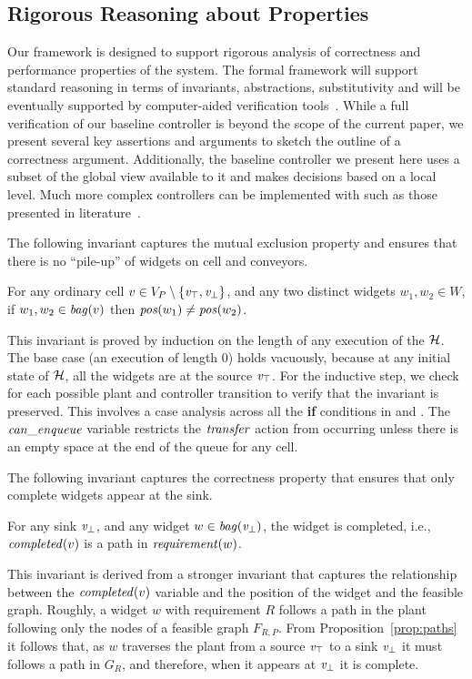 \subsection{Rigorous Reasoning about Properties}
\label{sec:prop}
Our \mfname framework is designed to support rigorous analysis of correctness and performance properties of the system. The formal framework will support standard reasoning in terms of invariants, abstractions,  substitutivity and will be eventually supported by  computer-aided verification tools~\cite{IOA89}.
%
While a full verification of our baseline controller is beyond the scope of the current paper, we present several key assertions and arguments to sketch the outline of a correctness argument. Additionally, the baseline controller we present here uses a subset of the global view available to it and makes decisions based on a local level. Much more complex controllers can be implemented with \mfname such as those presented in literature~\cite{Taylor2015}.

The following invariant  captures the mutual exclusion property and ensures that there is no ``pile-up'' of widgets on cell and conveyors. 
\begin{proposition}
\label{prop:mutex}
 For any ordinary cell $v \in V_P\setminus \{\mathit{v}_\top,\mathit{v}_\bot\}$, and any two distinct widgets $w_1, w_2 \in W$,
 if $w_1, w_2 \in \mathit{bag}(v)$ then $\mathit{pos}(w_1) \neq \mathit{pos}(w_2)$.
 \end{proposition}	
This invariant is  proved by induction on  the length of any execution of the $\mathcal{H}$. 
The base case (an execution of length $0$) holds vacuously, because at any  initial state of $\mathcal{H}$, all the widgets are at the source $\mathit{v}_\top$. For the inductive step, we check for each possible plant and controller transition to verify that the invariant is preserved. This involves a case analysis across all the {\bf if\/} conditions in  and . The $\mathit{can\_enqueue}$ variable restricts the $\mathit{transfer}$ action from occurring unless there is an empty space at the end of the queue for any cell.

The following invariant  captures the correctness property that ensures that only complete widgets appear at the sink.
\begin{proposition}
	\label{prop:completeness}
	For any sink $\mathit{v}_\bot$, and any widget $w \in \mathit{bag}(\mathit{v}_\bot)$, the widget is completed, i.e., 
	$\mathit{completed}(v)$ is a path in $\mathit{requirement}(w)$. 
\end{proposition}
This invariant is derived from a stronger invariant that captures the relationship between the $\mathit{completed}(v)$ variable and the position of the widget and the feasible graph. 
Roughly, a widget $w$ with requirement $R$ follows a path in the plant following only the nodes of a feasible graph $F_{R,P}$. From Proposition~\ref{prop:paths} it follows that, as $w$  traverses the plant from a source $\mathit{v}_\top$ to a sink $\mathit{v}_\bot$ it must follows a path in $G_R$, and therefore, when it appears at $\mathit{v}_\bot$ it is complete. 

